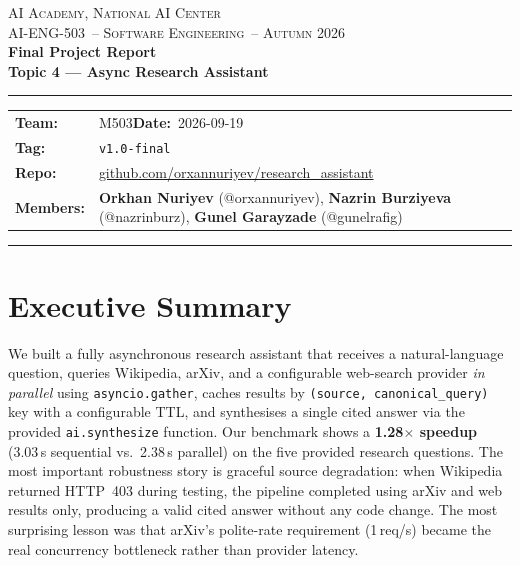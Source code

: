 \documentclass[11pt,a4paper]{article}
\newcommand{\teamname}{M503}
\newcommand{\topicchoice}{Topic 4 --- Async Research Assistant}
\newcommand{\member}[2]{\textbf{#1} (#2)}
\newcommand{\reportdate}{2026-09-19}
\newcommand{\repolink}{\href{https://github.com/orxannuriyev/research_assistant}{github.com/orxannuriyev/research\_assistant}}
\newcommand{\coursecode}{AI-ENG-503}
\newcommand{\coursename}{Software Engineering}
\newcommand{\institution}{AI Academy, National AI Center}
\newcommand{\semester}{Autumn 2026}
\begin{document}
\begin{center}
{\small \textsc{\institution} \\[0.2em] \textsc{\coursecode\ -- \coursename\ -- \semester}}\\[1.2em]
{\Large\bfseries\color{accent} Final Project Report}\\[0.3em]
{\LARGE\bfseries \topicchoice}\\[0.6em]
\rule{0.85\textwidth}{0.6pt}
\end{center}

\vspace{0.6em}
\begin{tabularx}{\textwidth}{@{}lX@{}}
\textbf{Team:} & \teamname \hfill \textbf{Date:}~\reportdate \\
\textbf{Tag:}  & \texttt{v1.0-final} \\
\textbf{Repo:} & \repolink \\
\textbf{Members:} &
  \member{Orkhan Nuriyev}{@orxannuriyev},\quad
  \member{Nazrin Burziyeva}{@nazrinburz},\quad
  \member{Gunel Garayzade}{@gunelrafig}\\
\end{tabularx}
\vspace{0.4em}\hrule\vspace{0.6em}

\section*{Executive Summary}

We built a fully asynchronous research assistant that receives a natural-language question, queries Wikipedia, arXiv, and a configurable web-search provider \emph{in parallel} using \texttt{asyncio.gather}, caches results by \texttt{(source, canonical\_query)} key with a configurable TTL, and synthesises a single cited answer via the provided \texttt{ai.synthesize} function. Our benchmark shows a \textbf{1.28$\times$ speedup} (3.03\,s sequential vs.\ 2.38\,s parallel) on the five provided research questions. The most important robustness story is graceful source degradation: when Wikipedia returned HTTP~403 during testing, the pipeline completed using arXiv and web results only, producing a valid cited answer without any code change. The most surprising lesson was that arXiv's polite-rate requirement (1\,req/s) became the real concurrency bottleneck rather than provider latency.
\end{document}
